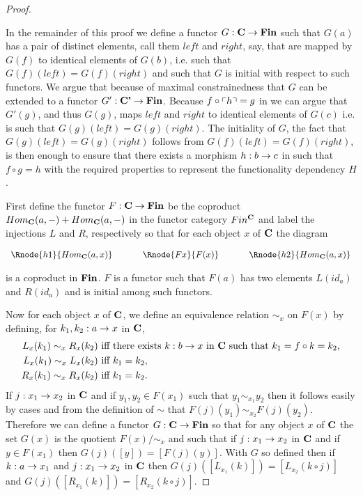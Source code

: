 \begin{proof}
\begin{newtt}
In the remainder of this proof 
we define a functor $G: \textbf{C} \rightarrow \textbf{Fin}$ such that
$G(a)$ has a pair of distinct elements, call them $left$ and $right$, say,  that are mapped by $G(f)$ to identical elements
of $G(b)$, i.e. such that $G(f)(left)= G(f)(right)$ 
and such that $G$ is initial with respect to such functors.  
We  argue that because of  maximal constrainedness that $G$ can be extended to a functor 
$G' : \textbf{C'} \rightarrow \textbf{Fin}$. 
Because $f \circ \left\ulcorner h\right\urcorner = g$ in \catcpw we can argue that $G'(g)$,
and thus $G(g)$,
maps $left$ and $right$ to identical elements of $G(c)$ 
i.e. is such that $G(g)(left)= G(g)(right)$. 
The initiality of $G$, the fact that  $G(g)(left)= G(g)(right)$ follows
from $G(f)(left)= G(f)(right)$, is then enough 
to ensure that there exists a morphism $h:b \rightarrow c$ in \catc
such that $f \circ g = h$
 with the required properties to represent the functionality dependency $H$.
\end{newtt}

First define the functor $F: \textbf{C} \rightarrow \textbf{Fin}$ be the coproduct $Hom_{\textbf{C}}(a,-) + Hom_{\textbf{C}}(a,-)$
in the functor category $Fin^{\textbf{C}}$ and label the injections $L$ and $R$, respectively so that
for each object $x$ of $\textbf{C}$ the diagram
\begin{center}
$
\begin{array}{c p{0.5cm} c p{0.5cm} c  }
\Rnode{h1}{Hom_{\catc}(a,x)}  &&\Rnode{Fx}{F(x)}  &&   \Rnode{h2}{Hom_{\catc}(a,x)}       
\end{array} 
$
\end{center}
is a coproduct in $\textbf{Fin}$. $F$ is a functor such that $F(a)$ has two elements
$L(id_a)$ and $R(id_a)$ and is initial among such functors.

Now for each object $x$ of $\textbf{C}$, we define an equivalence relation $\sim_x$ on $F(x)$ by defining,
for $k_1,k_2:a \rightarrow x$ in $\textbf{C}$,
\begin{align*}
L_x(k_1) \sim_x R_x(k_2) & \mbox{ iff there exists $k:b \rightarrow x$ in $\textbf{C}$ such that $k_1 = f \circ k = k_2$,}\\
L_x(k_1) \sim_x L_x(k_2) & \mbox{ iff $k_1 = k_2$,} \\
R_x(k_1) \sim_x R_x(k_2) & \mbox{ iff $k_1 = k_2$.} \\
\end{align*}
If $j: x_1 \rightarrow x_2$ in $\textbf{C}$ and if $y_1,y_2 \in F(x_1)$ such that $y_1 \sim_{x_1} y_2$
then it follows easily by cases and from the definition of $\sim$ that $F(j)(y_1) \sim_{x_2} F(j)(y_2)$.
Therefore we can define a functor 
 $G: \textbf{C} \rightarrow \textbf{Fin}$  so that for any object $x$ of $\textbf{C}$
the set $G(x)$ is the quotient $F(x)/{\sim_x}$ and such that 
if $j: x_1 \rightarrow x_2$ in $\textbf{C}$ and if $y \in F(x_1)$ then $G(j)([y])=[F(j)(y)]$.
With $G$ so defined then if $k: a \rightarrow x_1$ and $j:x_1 \rightarrow x_2$ in $\textbf{C}$
then  $G(j)([L_{x_1}(k)])=[L_{x_2}(k \circ j)]$ and $G(j)([R_{x_1}(k)])=[R_{x_2}(k \circ j)]$. 


\end{proof}
